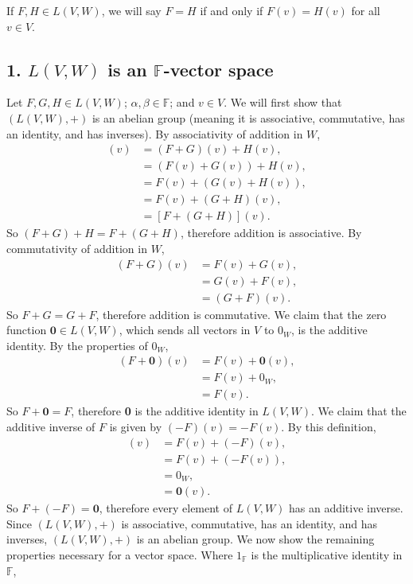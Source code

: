 \documentclass[12pt]{article}
\newcommand{\F}{\mathbb{F}}
\begin{document}
If $F, H \in L(V,W)$, we will say $F=H$ if and only if $F(v) = H(v)$ for all $v\in V$.

\subsection*{1. $L(V, W)$ is an $\F$-vector space}

Let $F,G,H \in L(V,W)$; $\alpha, \beta \in \F$; and $v\in V$. We will first show that $(L(V,W), +)$ is an abelian group (meaning it is associative, commutative, has an identity, and has inverses). By associativity of addition in $W$,
\begin{align*}
    [(F+G)+H](v)    &= (F+G)(v) + H(v), \\
                    &= (F(v) + G(v)) + H(v), \\
                    &= F(v) + (G(v) + H(v)), \\
                    &= F(v) + (G+H)(v), \\
                    &= [F+(G+H)](v).
\end{align*}
So $(F+G)+H = F+(G+H)$, therefore addition is associative. By commutativity of addition in $W$,
\begin{align*}
    (F+G)(v)    &= F(v) + G(v), \\
                &=  G(v) + F(v), \\
                &=  (G + F)(v).
\end{align*}
So $F+G=G+F$, therefore addition is commutative. We claim that the zero function $\textbf{0}\in L(V,W)$, which sends all vectors in $V$ to $0_W$, is the additive identity. By the properties of $0_W$,
\begin{align*}
    (F+\textbf{0})(v)   &= F(v) + \textbf{0}(v), \\
                        &= F(v) + 0_W, \\
                        &= F(v).
\end{align*}
So $F+\textbf{0}=F$, therefore \textbf{0} is the additive identity in $L(V,W)$. We claim that the additive inverse of $F$ is given by $(-F)(v) = -F(v)$. By this definition,
\begin{align*}
    [F + (-F)](v)   &= F(v) + (-F)(v), \\
                    &= F(v) + (-F(v)), \\
                    &= 0_W, \\
                    &= \textbf{0}(v).
\end{align*}
So $F+(-F) = \textbf{0}$, therefore every element of $L(V,W)$ has an additive inverse. Since $(L(V,W),+)$ is associative, commutative, has an identity, and has inverses, $(L(V,W),+)$ is an abelian group. We now show the remaining properties necessary for a vector space. Where $1_\F$ is the multiplicative identity in $\F$, 
\end{document}
